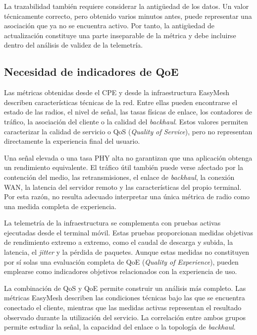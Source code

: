 La trazabilidad también requiere considerar la antigüedad de los datos. 
Un valor técnicamente correcto, pero obtenido varios minutos antes, 
puede representar una asociación que ya no se encuentra activo. 
Por tanto, la antigüedad de actualización constituye 
una parte inseparable de la métrica y 
debe incluirse dentro del análisis de validez de la telemetría.

\subsection{Necesidad de indicadores de QoE}
\label{subsec:necesidad-qoe}

Las métricas obtenidas desde el CPE y desde la infraestructura EasyMesh 
describen características técnicas de la red. 
Entre ellas pueden encontrarse el estado de las radios, 
el nivel de señal, las tasas físicas de enlace, los contadores de tráfico, 
la asociación del cliente o la calidad del \textit{backhaul}. 
Estos valores permiten caracterizar la calidad de servicio o QoS (\textit{Quality of Service}), 
pero no representan directamente la experiencia final del usuario.

Una señal elevada o una tasa PHY alta 
no garantizan que una aplicación obtenga un rendimiento equivalente. 
El tráfico útil también puede verse afectado por la contención del medio, 
las retransmisiones, el enlace de \textit{backhaul}, la conexión WAN, 
la latencia del servidor remoto y las características del propio terminal. 
Por esta razón, no resulta adecuado interpretar una única métrica de radio 
como una medida completa de experiencia.

La telemetría de la infraestructura se complementa con pruebas activas 
ejecutadas desde el terminal móvil. Estas pruebas proporcionan medidas
objetivas de rendimiento extremo a extremo, como el caudal de descarga y subida, 
la latencia, el \textit{jitter} y la pérdida de paquetes. 
Aunque estas medidas no constituyen por sí solas una evaluación 
completa de QoE (\textit{Quality of Experience}), 
pueden emplearse como indicadores objetivos relacionados con la experiencia de uso.

La combinación de QoS y QoE permite construir un análisis más completo. 
Las métricas EasyMesh describen las condiciones técnicas 
bajo las que se encuentra conectado el cliente, 
mientras que las medidas activas representan el resultado observado durante 
la utilización del servicio. La correlación entre ambos grupos permite estudiar 
la señal, la capacidad del enlace o la topología de \textit{backhaul}.

